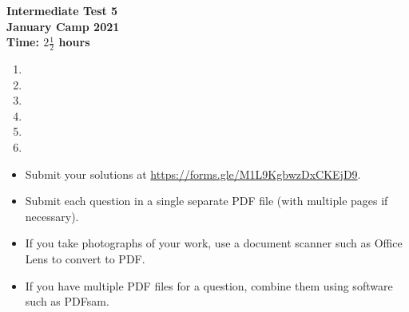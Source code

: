 \documentclass{article}
\begin{document}
\thispagestyle{empty}

\begin{center}
  \textbf{\Large Intermediate Test 5}
  \\ \vspace{1em}
  \textbf{\large January Camp 2021}
  \\ \vspace{1em}
  \textbf{\large Time: $2\frac{1}{2}$ hours}
\end{center}

\vspace{12pt}

\begin{enumerate}[1.]

\item %

\item %

\item %

\item %

\item %
 
\item %

\end{enumerate}


\vfill
\begin{itemize}
	\item Submit your solutions at \url{https://forms.gle/M1L9KgbwzDxCKEjD9}.
	\item Submit each question in a single separate PDF file (with multiple pages if necessary).
	\item If you take photographs of your work, use a document scanner such as Office Lens to convert to PDF.
	\item If you have multiple PDF files for a question, combine them using software such as PDFsam.
\end{itemize}

\vfill
\centering
\tiny
\begin{BVerbatim}
\end{BVerbatim}
\end{document}

